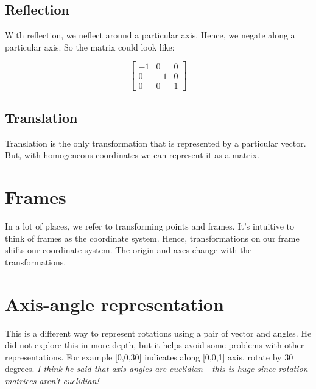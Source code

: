 \subsection{Reflection}

With reflection, we neflect around a particular axis. Hence, we negate along a particular axis. So the matrix could look like:

\begin{equation}
\begin{bmatrix}
-1 & 0 & 0\\
0 & -1 & 0 \\
0 & 0 & 1
\end{bmatrix}
\end{equation}

\subsection{Translation}

Translation is the only transformation that is represented by a particular vector. But, with homogeneous coordinates we can represent it as a matrix.

\section{Frames}

In a lot of places, we refer to transforming points and frames. It's intuitive to think of frames as the coordinate system. Hence, transformations on our frame shifts our coordinate system. The origin and axes change with the transformations.

\section{Axis-angle representation}

This is a different way to represent rotations using a pair of vector and angles. He did not explore this in more depth, but it helps avoid some problems with other representations. For example [0,0,30] indicates along [0,0,1] axis, rotate by 30 degrees. \textit{I think he said that axis angles are euclidian - this is huge since rotation matrices aren't euclidian!}